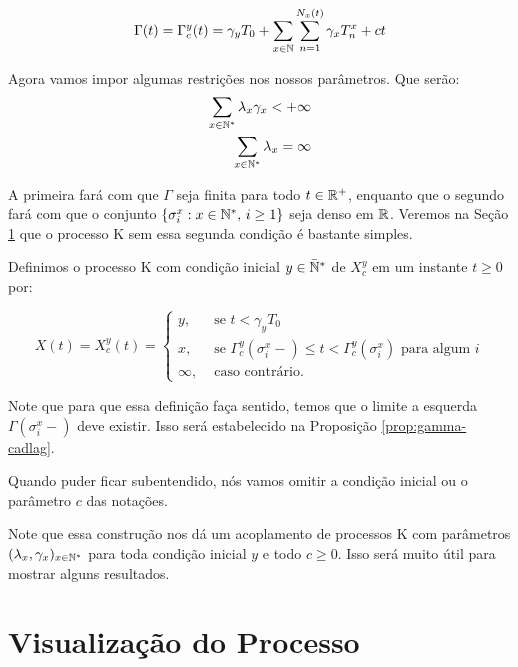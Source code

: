 \begin{equation}
  \label{def:Gamma}
  \Gamma(t) = \Gamma^y_c (t) = \gamma_y T_0
  + \sum_{x \in {\mathbb{N}}} \sum_{n = 1}^{N_x(t)}
  \gamma_x T_n^x
  + ct
\end{equation}

Agora vamos impor algumas restrições nos nossos parâmetros. Que serão:
\begin{align}
  \sum_{x \in {\mathbb{N^*}}} \lambda_x\gamma_x < +\infty\\
  \sum_{x \in {\mathbb{N^*}}} \lambda_x = \infty\\
\end{align}

A primeira fará com que $\Gamma$ seja \qc finita para todo $t \in
{\mathbb{R}}^+$, enquanto que o segundo fará com que o conjunto $\{\sigma^x_i: x
\in {\mathbb{N^*}}, \, i \geq 1\}$ seja denso em ${\mathbb{R}}$. Veremos na Seção
\ref{sec:visualizacao} que o processo K sem essa segunda condição é
bastante simples.

Definimos o processo K com condição inicial $y \in {\mathbb{\bar{N}^*}}$ de $X^y_c$ em
um instante $t \geq 0$ por:

\begin{equation}
  \label{def:procK}
  X(t) = X^y_c (t) =
  \begin{cases}
    y, & \textrm{ se }  t < \gamma_y T_0\\
    x, & \textrm{ se } \Gamma^y_c(\sigma_i^x-) \leq t <
    \Gamma^y_c(\sigma^x_i)
    \textrm{ para algum } i \\
    \infty, & \textrm{ caso contrário.}
  \end{cases}
\end{equation}

Note que para que essa definição faça sentido, temos que o limite a
esquerda $\Gamma (\sigma_i^x-)$ deve existir. Isso será estabelecido
na Proposição \ref{prop:gamma-cadlag}.

Quando puder ficar subentendido, nós vamos omitir a condição inicial
ou o parâmetro $c$ das notações.

Note que essa construção nos dá um acoplamento de processos K com
parâmetros $(\lambda_x, \gamma_x)_{x \in {\mathbb{N^*}}}$ para toda condição
inicial $y$ e todo $c \geq 0$. Isso será muito útil para mostrar
alguns resultados.



\section{Visualização do Processo}
\label{sec:visualizacao}

